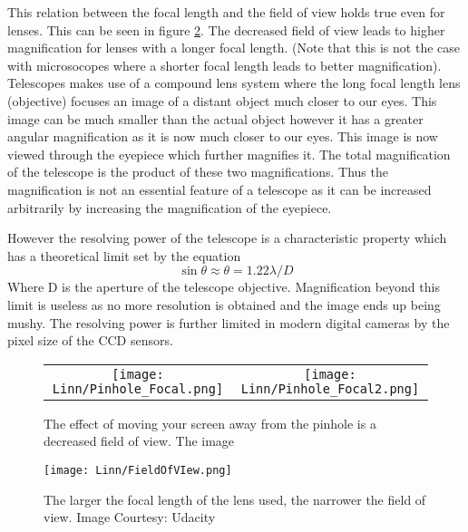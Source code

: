 \documentclass{../template/texnote}
\begin{document}
This relation between the focal length and the field of view holds true even for lenses. This can be seen in figure \ref{fig:lens_focal}. The decreased field of view leads to higher magnification for lenses with a longer focal length. (Note that this is not the case with microsocopes where a shorter focal length leads to better magnification). Telescopes makes use of a compound lens system where the long focal length lens (objective) focuses an image of a distant object much closer to our eyes. This image can be much smaller than the actual object however it has a greater angular magnification as it is now much closer to our eyes. This image is now viewed through the eyepiece which further magnifies it. The total magnification of the telescope is the product of these two magnifications. Thus the magnification is not an essential feature of a telescope as it can be increased arbitrarily by increasing the magnification of the eyepiece.

However the resolving power of the telescope is a characteristic property which has a theoretical limit set by the equation $$\sin \theta \approx \theta = 1.22\lambda/D$$ Where D is the aperture of the telescope objective. Magnification beyond this limit is useless as no more resolution is obtained and the image ends up being mushy. The resolving power is further limited in modern digital cameras by the pixel size of the CCD sensors.


\begin{figure}
\begin{tabular}{cc}
  \texttt{[image: Linn/Pinhole\_Focal.png]} &   \texttt{[image: Linn/Pinhole\_Focal2.png]} \\
\end{tabular}
\caption{The effect of moving your screen away from the pinhole is a decreased field of view. The image
}
\label{fig:pinhole_focal}
\end{figure}



\begin{figure}
    \centering
    \texttt{[image: Linn/FieldOfVIew.png]}
    \caption{The larger the focal length of the lens used, the narrower the field of view. Image Courtesy: Udacity}
    \label{fig:lens_focal}
\end{figure}
\end{document}
